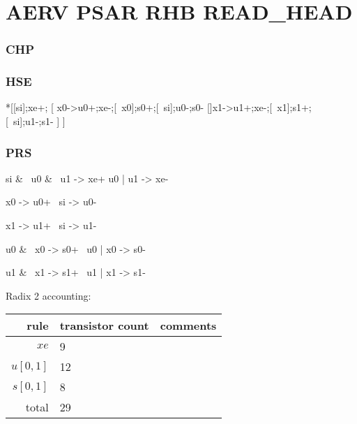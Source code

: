 \documentclass{article}
\begin{document}
\section{AERV PSAR RHB READ\_HEAD \label{sec:AERV_PSAR_RHB_READ_HEAD}}

\subsubsection*{CHP}

\subsubsection*{HSE}

\begin{hse}
*[[si];xe+;
    [ x0->u0+;xe-;[~x0];s0+;[~si];u0-;s0-
    []x1->u1+;xe-;[~x1];s1+;[~si];u1-;s1-
    ]
 ]
\end{hse}

\subsubsection*{PRS}

\begin{prs2}
si & ~u0 & ~u1 -> xe+
u0 | u1 -> xe-
\end{prs2}

\begin{prs2}
x0 -> u0+
~si -> u0-

x1 -> u1+
~si -> u1-

u0 & ~x0 -> s0+
~u0 | x0 -> s0-

u1 & ~x1 -> s1+
~u1 | x1 -> s1-
\end{prs2}

\noindent Radix 2 accounting:

\begin{center}
    \begin{tabular}{|r|l|l|}
    \hline
    rule & transistor count & comments \\ \hline
    $xe$ & 9 & \\ \hline
    $u[0,1]$ & 12 & \\ \hline
    $s[0,1]$ & 8 & \\ \hline \hline
    total & 29 & \\ \hline
    \end{tabular}
\end{center}
\end{document}

